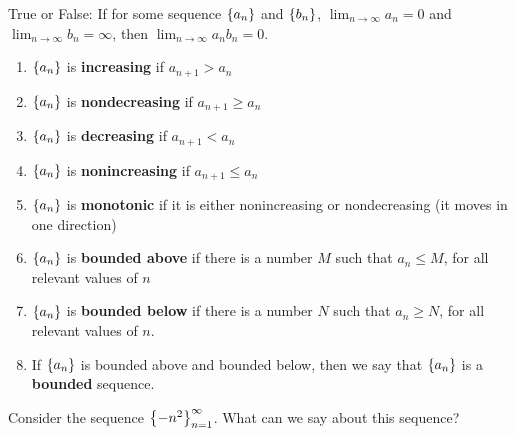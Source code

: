 \documentclass[../mathNotesPreamble]{subfiles}
\begin{document}
  \noindent
  True or False: If for some sequence ${\left\{a_n\right\}}$ and ${\left\{b_n\right\}}$, $\displaystyle\lim_{n\to \infty}a_n=0$ and $\displaystyle\lim_{n\to \infty} b_n=\infty$, then $\displaystyle\lim_{n\to \infty} a_nb_n=0$.
  \pagebreak

  \begin{defn*}
    \begin{enumerate}[label=\textbullet, itemsep=15pt]
      \item ${\left\{a_n\right\}}$ is \textbf{increasing} if $a_{n+1}>a_n$
      \item ${\left\{a_n\right\}}$ is \textbf{nondecreasing} if $a_{n+1}\geq a_n$
      \item ${\left\{a_n\right\}}$ is \textbf{decreasing} if $a_{n+1}< a_n$
      \item ${\left\{a_n\right\}}$ is \textbf{nonincreasing} if $a_{n+1}\leq a_n$
      \item ${\left\{a_n\right\}}$ is \textbf{monotonic} if it is either nonincreasing or nondecreasing (it moves in one direction)
      \item ${\left\{a_n\right\}}$ is \textbf{bounded above} if there is a number $M$ such that $a_n\leq M$, for all relevant values of $n$
      \item ${\left\{a_n\right\}}$ is \textbf{bounded below} if there is a number $N$ such that $a_n\geq N$, for all relevant values of $n$.
      \item If ${\left\{a_n\right\}}$ is bounded above and bounded below, then we say that ${\left\{a_n\right\}}$ is a \textbf{bounded} sequence.
    \end{enumerate}
  \end{defn*}
  \begin{ex*}
    Consider the sequence ${\left\{-n^2\right\}}_{n=1}^{\infty}$. What can we say about this sequence?
  \end{ex*}
  \pagebreak
\end{document}
